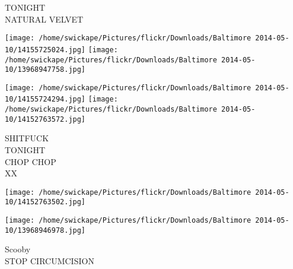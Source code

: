 \documentclass[10pt,letterpaper]{article}
\begin{document}
TONIGHT\\
NATURAL VELVET\\
\pagebreak

\texttt{[image: /home/swickape/Pictures/flickr/Downloads/Baltimore 2014-05-10/14155725024.jpg]}
\texttt{[image: /home/swickape/Pictures/flickr/Downloads/Baltimore 2014-05-10/13968947758.jpg]}

\texttt{[image: /home/swickape/Pictures/flickr/Downloads/Baltimore 2014-05-10/14155724294.jpg]}
\texttt{[image: /home/swickape/Pictures/flickr/Downloads/Baltimore 2014-05-10/14152763572.jpg]}

SHITFUCK\\
TONIGHT\\
CHOP CHOP\\
XX\\
\pagebreak

\texttt{[image: /home/swickape/Pictures/flickr/Downloads/Baltimore 2014-05-10/14152763502.jpg]}

\vspace{0.25in}
\texttt{[image: /home/swickape/Pictures/flickr/Downloads/Baltimore 2014-05-10/13968946978.jpg]}

Scooby\\
STOP CIRCUMCISION\\
\pagebreak
\end{document}

